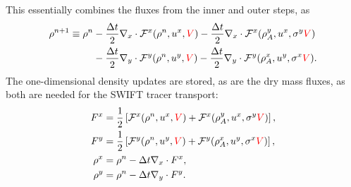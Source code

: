 \documentclass{ametsocV6.1}
\newcommand{\change}[1]{\textcolor{red}{#1}}
\begin{document}
This essentially combines the fluxes from the inner and outer steps, as
\begin{equation} \label{eqn:swift_density_2}
\begin{split}
\rho^{n+1} \equiv \rho^n & - \frac{\Delta t}{2} \nabla_x\cdot \mathcal{F}^x(\rho^n, u^x, \change{V}) - \frac{\Delta{t}}{2} \nabla_x\cdot \mathcal{F}^x(\rho^y_A, u^x, \sigma^y\change{V}) \\
& - \frac{\Delta{t}}{2} \nabla_y\cdot \mathcal{F}^y(\rho^n, u^y,\change{V}) - \frac{\Delta{t}}{2} \nabla_y\cdot \mathcal{F}^y(\rho^x_A, u^y, \sigma^x\change{V}).
\end{split}
\end{equation}
The one-dimensional density updates are stored, as are the dry mass fluxes, as both are needed for the SWIFT tracer transport:
\begin{subequations}
\begin{align}
F^x &= \frac{1}{2}\left[ \mathcal{F}^x(\rho^n, u^x,\change{V}) +  \mathcal{F}^x(\rho^y_A, u^x, \sigma^y\change{V})\right], \\ 
F^y &= \frac{1}{2}\left[ \mathcal{F}^y(\rho^n, u^y,\change{V}) +  \mathcal{F}^y(\rho^x_A, u^y, \sigma^x\change{V})\right], \\
\rho^x &= \rho^{n} - \Delta{t} \nabla_x\cdot F^x, \\
\rho^y &= \rho^{n} - \Delta{t} \nabla_y\cdot F^y. 
\end{align}
\end{subequations}
\end{document}
